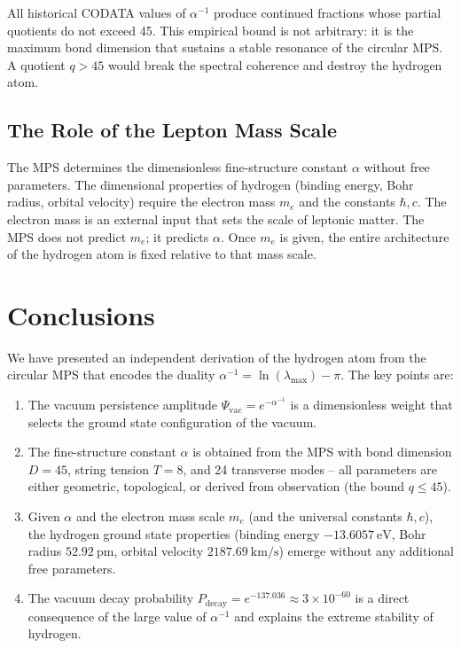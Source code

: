 \documentclass[12pt]{article}
\begin{document}
All historical CODATA values of \(\alpha^{-1}\) produce continued fractions whose partial quotients do not exceed 45. This empirical bound is not arbitrary: it is the maximum bond dimension that sustains a stable resonance of the circular MPS. A quotient \(q > 45\) would break the spectral coherence and destroy the hydrogen atom.

\subsection{The Role of the Lepton Mass Scale}

The MPS determines the dimensionless fine-structure constant \(\alpha\) without free parameters. The dimensional properties of hydrogen (binding energy, Bohr radius, orbital velocity) require the electron mass \(m_e\) and the constants \(\hbar, c\). The electron mass is an external input that sets the scale of leptonic matter. The MPS does not predict \(m_e\); it predicts \(\alpha\). Once \(m_e\) is given, the entire architecture of the hydrogen atom is fixed relative to that mass scale.

\section{Conclusions}

We have presented an independent derivation of the hydrogen atom from the circular MPS that encodes the duality \(\alpha^{-1} = \ln(\lambda_{\max}) - \pi\). The key points are:

\begin{enumerate}
    \item The vacuum persistence amplitude \(\Psi_{\text{vac}} = e^{-\alpha^{-1}}\) is a dimensionless weight that selects the ground state configuration of the vacuum.
    \item The fine-structure constant \(\alpha\) is obtained from the MPS with bond dimension \(D=45\), string tension \(T=8\), and 24 transverse modes – all parameters are either geometric, topological, or derived from observation (the bound \(q \le 45\)).
    \item Given \(\alpha\) and the electron mass scale \(m_e\) (and the universal constants \(\hbar, c\)), the hydrogen ground state properties (binding energy \(-13.6057\ \text{eV}\), Bohr radius \(52.92\ \text{pm}\), orbital velocity \(2187.69\ \text{km/s}\)) emerge without any additional free parameters.
    \item The vacuum decay probability \(P_{\text{decay}} = e^{-137.036} \approx 3\times10^{-60}\) is a direct consequence of the large value of \(\alpha^{-1}\) and explains the extreme stability of hydrogen.
\end{enumerate}
\end{document}
